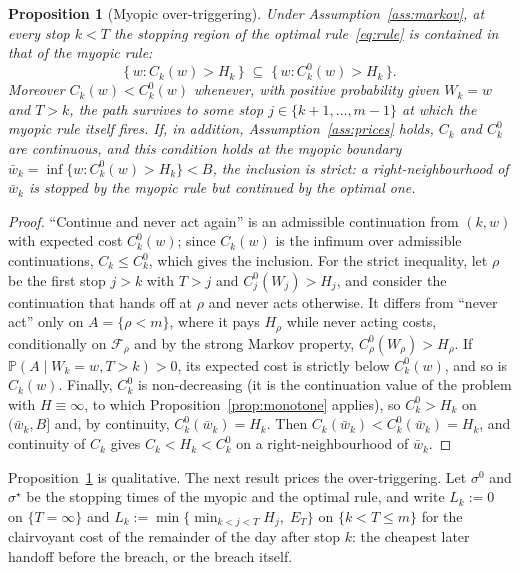 \documentclass[preprint,authoryear,12pt]{elsarticle}
\newtheorem{proposition}[theorem]{Proposition}
\theoremstyle{definition}
\theoremstyle{remark}
\begin{document}
\begin{proposition}[Myopic over-triggering]\label{prop:myopic}
Under Assumption~\ref{ass:markov}, at every stop $k < T$ the stopping region
of the optimal rule~\eqref{eq:rule} is contained in that of the myopic
rule:
\[
  \{\, w : C_k(w) > H_k \,\} \;\subseteq\;
  \{\, w : C^0_k(w) > H_k \,\} .
\]
Moreover $C_k(w) < C^0_k(w)$ whenever, with positive probability given
$W_k = w$ and $T > k$, the path survives to some stop
$j \in \{k+1, \dots, m-1\}$ at which the myopic rule itself fires. If,
in addition, Assumption~\ref{ass:prices} holds, $C_k$ and $C^0_k$ are
continuous, and this condition holds at the myopic
boundary $\bar w_k = \inf\{w : C^0_k(w) > H_k\} < B$, the inclusion is
strict: a right-neighbourhood of $\bar w_k$ is stopped by the myopic rule
but continued by the optimal one.
\end{proposition}

\begin{proof}
``Continue and never act again'' is an admissible continuation from
$(k,w)$ with expected cost $C^0_k(w)$; since $C_k(w)$ is the infimum over
admissible continuations, $C_k \le C^0_k$, which gives the inclusion.
For the strict inequality, let $\rho$ be the first stop $j > k$ with
$T > j$ and $C^0_j(W_j) > H_j$, and consider the continuation that hands
off at $\rho$ and never acts otherwise. It differs from ``never act''
only on $A = \{\rho < m\}$, where it pays $H_\rho$ while never acting
costs, conditionally on $\mathcal F_\rho$ and by the strong Markov
property, $C^0_\rho(W_\rho) > H_\rho$. If $\mathbb P(A \mid W_k = w,
T > k) > 0$, its expected cost is strictly below $C^0_k(w)$, and so is
$C_k(w)$. Finally, $C^0_k$ is non-decreasing (it is the continuation
value of the problem with $H \equiv \infty$, to which
Proposition~\ref{prop:monotone} applies), so $C^0_k > H_k$ on
$(\bar w_k, B]$ and, by continuity, $C^0_k(\bar w_k) = H_k$. Then
$C_k(\bar w_k) < C^0_k(\bar w_k) = H_k$, and continuity of $C_k$ gives
$C_k < H_k < C^0_k$ on a right-neighbourhood of $\bar w_k$.
\end{proof}

Proposition~\ref{prop:myopic} is qualitative. The next result prices
the over-triggering. Let $\sigma^0$ and $\sigma^\star$ be the stopping
times of the myopic and the optimal rule, and write
$L_k := 0$ on $\{T = \infty\}$ and
$L_k := \min\{\min_{k<j<T} H_j,\; E_T\}$ on $\{k < T \le m\}$ for the
clairvoyant cost of the remainder of the day after stop $k$: the
cheapest later handoff before the breach, or the breach itself.
\end{document}

